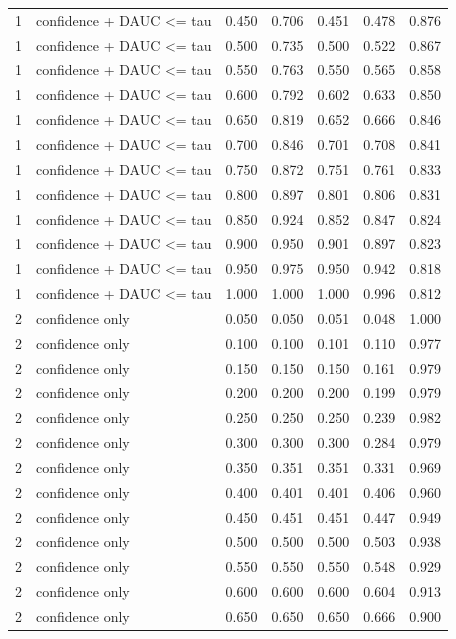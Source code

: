 \begin{tabular}{rlrrrrr}
1 & confidence + DAUC <= tau & 0.450 & 0.706 & 0.451 & 0.478 & 0.876 \\
1 & confidence + DAUC <= tau & 0.500 & 0.735 & 0.500 & 0.522 & 0.867 \\
1 & confidence + DAUC <= tau & 0.550 & 0.763 & 0.550 & 0.565 & 0.858 \\
1 & confidence + DAUC <= tau & 0.600 & 0.792 & 0.602 & 0.633 & 0.850 \\
1 & confidence + DAUC <= tau & 0.650 & 0.819 & 0.652 & 0.666 & 0.846 \\
1 & confidence + DAUC <= tau & 0.700 & 0.846 & 0.701 & 0.708 & 0.841 \\
1 & confidence + DAUC <= tau & 0.750 & 0.872 & 0.751 & 0.761 & 0.833 \\
1 & confidence + DAUC <= tau & 0.800 & 0.897 & 0.801 & 0.806 & 0.831 \\
1 & confidence + DAUC <= tau & 0.850 & 0.924 & 0.852 & 0.847 & 0.824 \\
1 & confidence + DAUC <= tau & 0.900 & 0.950 & 0.901 & 0.897 & 0.823 \\
1 & confidence + DAUC <= tau & 0.950 & 0.975 & 0.950 & 0.942 & 0.818 \\
1 & confidence + DAUC <= tau & 1.000 & 1.000 & 1.000 & 0.996 & 0.812 \\
2 & confidence only & 0.050 & 0.050 & 0.051 & 0.048 & 1.000 \\
2 & confidence only & 0.100 & 0.100 & 0.101 & 0.110 & 0.977 \\
2 & confidence only & 0.150 & 0.150 & 0.150 & 0.161 & 0.979 \\
2 & confidence only & 0.200 & 0.200 & 0.200 & 0.199 & 0.979 \\
2 & confidence only & 0.250 & 0.250 & 0.250 & 0.239 & 0.982 \\
2 & confidence only & 0.300 & 0.300 & 0.300 & 0.284 & 0.979 \\
2 & confidence only & 0.350 & 0.351 & 0.351 & 0.331 & 0.969 \\
2 & confidence only & 0.400 & 0.401 & 0.401 & 0.406 & 0.960 \\
2 & confidence only & 0.450 & 0.451 & 0.451 & 0.447 & 0.949 \\
2 & confidence only & 0.500 & 0.500 & 0.500 & 0.503 & 0.938 \\
2 & confidence only & 0.550 & 0.550 & 0.550 & 0.548 & 0.929 \\
2 & confidence only & 0.600 & 0.600 & 0.600 & 0.604 & 0.913 \\
2 & confidence only & 0.650 & 0.650 & 0.650 & 0.666 & 0.900 \\

\end{tabular}
